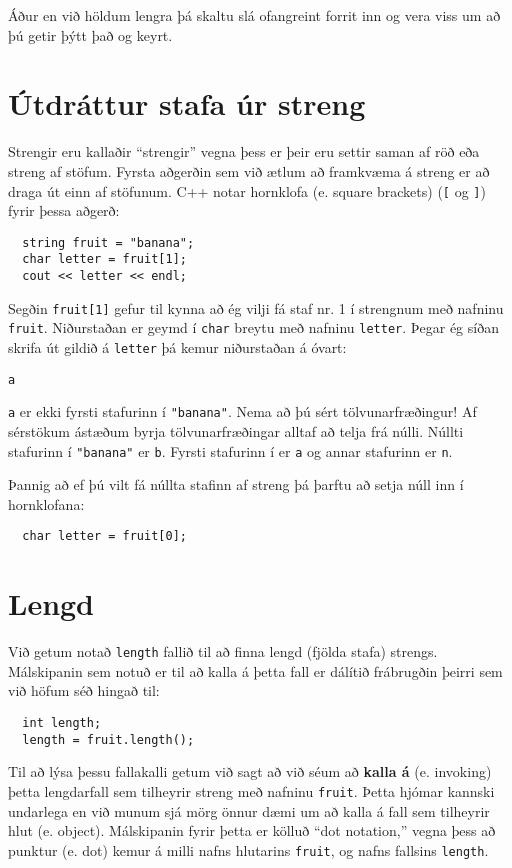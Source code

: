 Áður en við höldum lengra þá skaltu slá ofangreint forrit inn og vera viss um að þú getir þýtt það og keyrt.

\section{Útdráttur stafa úr streng}

Strengir eru kallaðir ``strengir'' vegna þess er þeir eru settir saman af röð eða streng af stöfum.
Fyrsta aðgerðin sem við ætlum að framkvæma á streng er að draga út einn af stöfunum.
C++ notar hornklofa (e. square brackets) ({\tt [} og {\tt ]}) fyrir þessa aðgerð:

\begin{verbatim}
  string fruit = "banana";
  char letter = fruit[1];
  cout << letter << endl;
\end{verbatim}
%
Segðin {\tt fruit[1]} gefur til kynna að ég vilji fá staf nr. 1 í strengnum með nafninu {\tt fruit}.
Niðurstaðan er geymd í {\tt char} breytu með nafninu {\tt letter}.
Þegar ég síðan skrifa út gildið á {\tt letter} þá kemur niðurstaðan á óvart:

\begin{verbatim}
a
\end{verbatim}
%
{\tt a} er ekki fyrsti stafurinn í \verb+"banana"+.
Nema að þú sért tölvunarfræðingur!
Af sérstökum ástæðum byrja tölvunarfræðingar alltaf að telja frá núlli.
Núllti stafurinn í \verb+"banana"+ er {\tt b}.
Fyrsti stafurinn í er {\tt a} og annar stafurinn er {\tt n}.

Þannig að ef þú vilt fá núllta stafinn af streng þá þarftu að setja núll inn í hornklofana: 

\begin{verbatim}
  char letter = fruit[0];
\end{verbatim}

\section{Lengd}

Við getum notað {\tt length} fallið til að finna lengd (fjölda stafa) strengs.
Málskipanin sem notuð er til að kalla á þetta fall er dálítið frábrugðin þeirri sem við höfum séð hingað til:

\begin{verbatim}
  int length;
  length = fruit.length();
\end{verbatim}
%
Til að lýsa þessu fallakalli getum við sagt að við séum að {\bf kalla á} (e. invoking) þetta lengdarfall sem tilheyrir streng með nafninu {\tt fruit}.
Þetta hjómar kannski undarlega en við munum sjá mörg önnur dæmi um að kalla á fall sem tilheyrir hlut (e. object).
Málskipanin fyrir þetta er kölluð ``dot notation,'' vegna þess að punktur (e. dot) kemur á milli nafns hlutarins
{\tt fruit}, og nafns fallsins {\tt length}.

